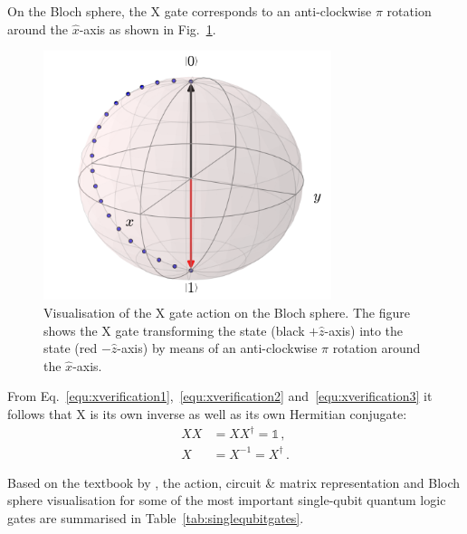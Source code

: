 On the Bloch sphere, the X gate corresponds to an anti-clockwise $\pi$ rotation around the $\hat{x}$-axis as shown in Fig.~\ref{img:blochxgate}.

\begin{figure}[ht]
   \centering
   \includegraphics[width=0.75\textwidth]{img/blochxgate.png}
   \caption{Visualisation of the X gate action on the Bloch sphere. The figure shows the X gate transforming the \0 state (black $+\hat{z}$-axis) into the \1 state (red $-\hat{z}$-axis) by means of an anti-clockwise $\pi$ rotation around the $\hat{x}$-axis.}
   \label{img:blochxgate}
\end{figure}

From Eq.~\ref{equ:xverification1},~\ref{equ:xverification2} and~\ref{equ:xverification3} it follows that X is its own inverse as well as its own Hermitian conjugate:
\begin{align}
XX &= XX^\dagger = \mathbb{1}\, , \\
X &= X^{-1} = X^\dagger\, .
\end{align}

Based on the textbook by , the action, circuit \& matrix representation and Bloch sphere visualisation for some of the most important single-qubit quantum logic gates are summarised in Table~\ref{tab:singlequbitgates}.

